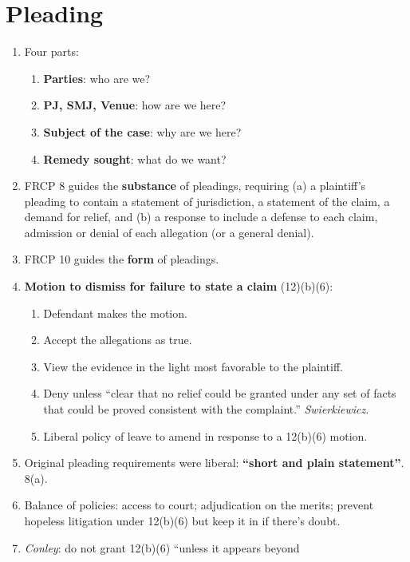 \section{Pleading}

\begin{enumerate}
    \item Four parts:
    \begin{enumerate}
        \item \textbf{Parties}: who are we?
        \item \textbf{PJ, SMJ, Venue}: how are we here?
        \item \textbf{Subject of the case}: why are we here?
        \item \textbf{Remedy sought}: what do we want?
    \end{enumerate}
    \item FRCP 8 guides the \textbf{substance} of pleadings, requiring (a) a 
    plaintiff's pleading to contain a statement of jurisdiction, a statement 
    of the claim, a demand for relief, and (b) a response to include a defense 
    to each claim, admission or denial of each allegation (or a general 
    denial).
    \item FRCP 10 guides the \textbf{form} of pleadings.
    \item \textbf{Motion to dismiss for failure to state a claim} (12)(b)(6):
    \begin{enumerate}
        \item Defendant makes the motion.
        \item Accept the allegations as true.
        \item View the evidence in the light most favorable to the plaintiff.
        \item Deny unless ``clear that no relief could be granted under any 
        set of facts that could be proved consistent with the complaint.'' 
        \emph{Swierkiewicz}.
        \item Liberal policy of leave to amend in response to a 12(b)(6) 
        motion.
    \end{enumerate}
    \item Original pleading requirements were liberal: \textbf{``short and 
    plain statement''}. 8(a).
    \item Balance of policies: access to court; adjudication on the merits; 
    prevent hopeless litigation under 12(b)(6) but keep it in if there's 
    doubt.
    \item \emph{Conley}: do not grant 12(b)(6) ``unless it appears beyond 

\end{enumerate}
